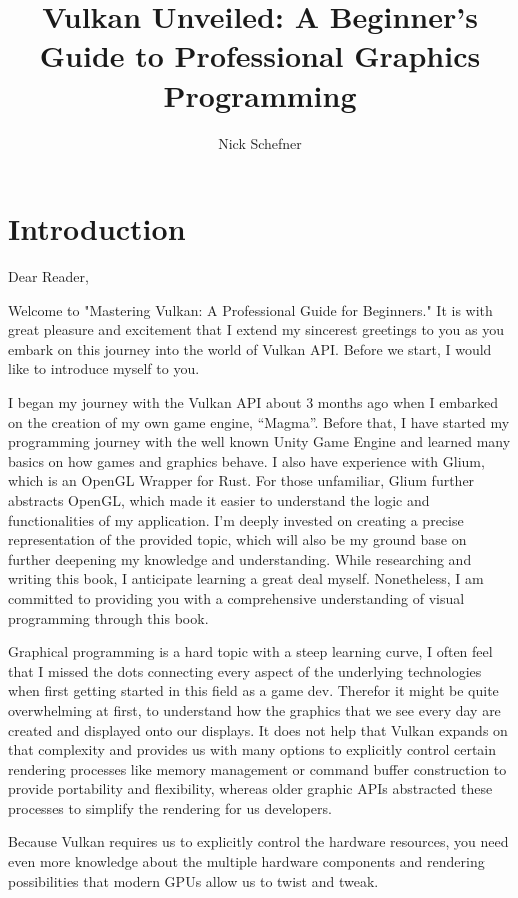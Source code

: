 \documentclass[12pt]{report} \usepackage{preamble}
\title{\textbf{\huge Vulkan Unveiled: A Beginner's Guide to Professional
Graphics Programming}} \author {Nick Schefner}
\begin{document}
 \maketitle

\tableofcontents

\chapter{Introduction}

Dear Reader,

Welcome to "Mastering Vulkan: A Professional Guide for Beginners."  It is
with great pleasure and excitement that I extend my sincerest greetings
to you as you embark on this journey into the world of Vulkan API.
Before we start, I would like to introduce myself to you.

I began my journey with the Vulkan API about 3 months ago when I embarked
on the creation of my own game engine, “Magma”.  Before that, I have
started my programming journey with the well known Unity Game Engine
and learned many basics on how games and graphics behave. I also have
experience with Glium, which is an OpenGL Wrapper for Rust. For those
unfamiliar, Glium further abstracts OpenGL, which made it easier to
understand the logic and functionalities of my application.  I’m deeply
invested on creating a precise representation of the provided topic,
which will also be my ground base on further deepening my knowledge and
understanding.	While researching and writing this book, I anticipate
learning a great deal myself.  Nonetheless, I am committed to providing
you with a comprehensive understanding of visual programming through
this book.

Graphical programming is a hard topic with a steep learning curve,
I often feel that I missed the dots connecting every aspect of the
underlying technologies when first getting started in this field as a
game dev. Therefor it might be quite overwhelming at first, to understand
how the graphics that we see every day are created and displayed onto
our displays. It does not help that Vulkan expands on that complexity
and provides us with many options to explicitly control certain rendering
processes like memory management or command buffer construction to provide
portability and flexibility, whereas older graphic APIs abstracted these
processes to simplify the rendering for us developers.

Because Vulkan requires us to explicitly control the hardware resources,
you need even more knowledge about the multiple hardware components and
rendering possibilities that modern GPUs allow us to twist and tweak.
\end{document}
